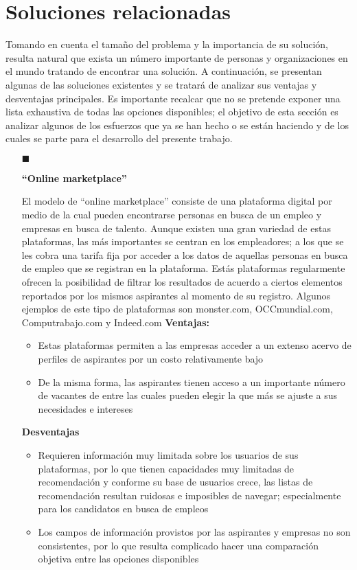 \section{Soluciones relacionadas}
  Tomando en cuenta el tamaño del problema y la importancia de su solución, resulta natural que exista un número importante de personas y organizaciones en el mundo tratando de encontrar una solución. A continuación, se presentan algunas de las soluciones existentes y se tratará de analizar sus ventajas y desventajas principales. Es importante recalcar que no se pretende exponer una lista exhaustiva de todas las opciones disponibles; el objetivo de esta sección es analizar algunos de los esfuerzos que ya se han hecho o se están haciendo y de los cuales se parte para el desarrollo del presente trabajo.
  \begin{itemize}
    \item[$\blacksquare$] 
    \begin{flushleft}
    \textbf{“Online marketplace”}
    \end{flushleft}
    \linebreak
  El modelo de “online marketplace” consiste de una plataforma digital por medio de la cual pueden encontrarse personas en busca de un empleo y empresas en busca de talento. Aunque existen una gran variedad de estas plataformas, las más importantes se centran en los empleadores; a los que se les cobra una tarifa fija por acceder a los datos de aquellas personas en busca de empleo que se registran en la plataforma. Estás plataformas regularmente ofrecen la posibilidad de filtrar los resultados de acuerdo a ciertos elementos reportados por los mismos aspirantes al momento de su registro.
  Algunos ejemplos de este tipo de plataformas son monster.com, OCCmundial.com, Computrabajo.com y Indeed.com
  \linebreak
  \linebreak
  \textbf{Ventajas:} 
  \begin{itemize}
    \item  Estas plataformas permiten a las empresas acceder a un extenso acervo de perfiles de aspirantes por un costo relativamente bajo
    \item  De la misma forma, las aspirantes tienen acceso a un importante número de vacantes de entre las cuales pueden elegir la que más se ajuste a sus necesidades e intereses
  \end{itemize}

  \textbf{Desventajas}
  \begin{itemize}
    \item Requieren información muy limitada sobre los usuarios de sus plataformas, por lo que tienen capacidades muy limitadas de recomendación y conforme su base de usuarios crece, las listas de recomendación resultan ruidosas e imposibles de navegar; especialmente para los candidatos en busca de empleos
    \item  Los campos de información provistos por las aspirantes y empresas no son consistentes, por lo que resulta complicado hacer una comparación objetiva entre las opciones disponibles
  \end{itemize}



\end{itemize}
